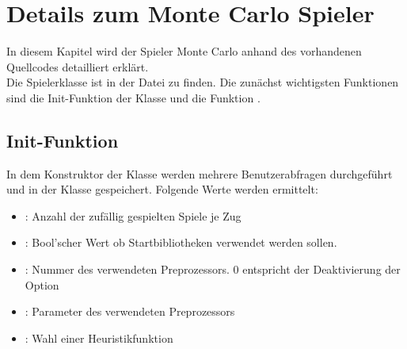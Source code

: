 \section{Details zum Monte Carlo Spieler}
In diesem Kapitel wird der Spieler Monte Carlo anhand des vorhandenen Quellcodes detailliert erklärt.
\\Die Spielerklasse  ist in der Datei  zu finden.
Die zunächst wichtigsten Funktionen sind die Init-Funktion der Klasse und die Funktion .
\subsection{Init-Funktion}
In dem Konstruktor der Klasse  werden mehrere Benutzerabfragen durchgeführt und in der Klasse gespeichert. Folgende Werte werden ermittelt:
\begin{itemize}
\item {}: Anzahl der zufällig gespielten Spiele je Zug
\item {}: Bool'scher Wert ob Startbibliotheken verwendet werden sollen.
\item {}: Nummer des verwendeten Preprozessors. 0 entspricht der Deaktivierung der Option
\item {}: Parameter des verwendeten Preprozessors
\item {}: Wahl einer Heuristikfunktion
\end{itemize}

